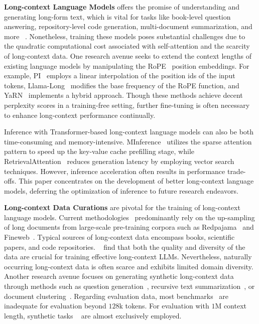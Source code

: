 \documentclass{article}
\begin{document}
\noindent
\textbf{Long-context Language Models}
offers the promise of understanding and generating long-form text,
which is vital for tasks like book-level question answering, repository-level code generation,
multi-document summarization, and more ~\citep{lee2024can,jiang2024longrag}.
Nonetheless,
training these models poses substantial challenges due to
the quadratic computational cost associated with self-attention and the scarcity of long-context data.
One research avenue seeks to extend the context lengths of existing language models
by manipulating the RoPE~\citep{su2024roformer} position embeddings.
For example,
PI~\citep{chen2023extending} employs a linear interpolation of the position ids of the input tokens,
Llama-Long~\citep{xiong2024effective} modifies the base frequency of the RoPE function,
and YaRN~\citep{pengyarn} implements a hybrid approach.
Though these methods achieve decent perplexity scores in a training-free setting,
further fine-tuning is often necessary to enhance long-context performance continually.

Inference with Transformer-based long-context language models can also be both time-consuming and memory-intensive.
MInference~\citep{jiang2024minference} utilizes the sparse attention pattern to speed up the key-value cache prefilling stage,
while RetrievalAttention~\citep{liu2024retrievalattention} reduces generation latency by employing vector search techniques.
However,
inference acceleration often results in performance trade-offs.
This paper concentrates on the development of better long-context language models,
deferring the optimization of inference to future research endeavors.

\noindent
\textbf{Long-context Data Curations}
are pivotal for the training of long-context language models.
Current methodologies~\citep{fu2024data,gao2024train,pengyarn} predominantly rely on the up-sampling of long documents
from large-scale pre-training corpora such as Redpajama~\citep{together2023redpajama} and Fineweb~\citep{penedo2024fineweb}.
Typical sources of long-context data encompass books, scientific papers, and code repositories.
~\citeauthor{fu2024data,gao2024train} find that both the quality and diversity of the data
are crucial for training effective long-context LLMs.
Nevertheless,
naturally occurring long-context data is often scarce and exhibits limited domain diversity.
Another research avenue focuses on generating synthetic long-context data
through methods such as question generation~\citep{an2024make,dubey2024llama},
recursive text summarization~\citep{dubey2024llama},
or document clustering~\citep{gao2024quest}.
Regarding evaluation data,
most benchmarks~\citep{bai2023longbench,shaham2023zeroscrolls} are inadequate for evaluation beyond $128$k tokens.
For evaluation with $1$M context length,
synthetic tasks ~\citep{hsieh2024ruler} are almost exclusively employed.
\end{document}
